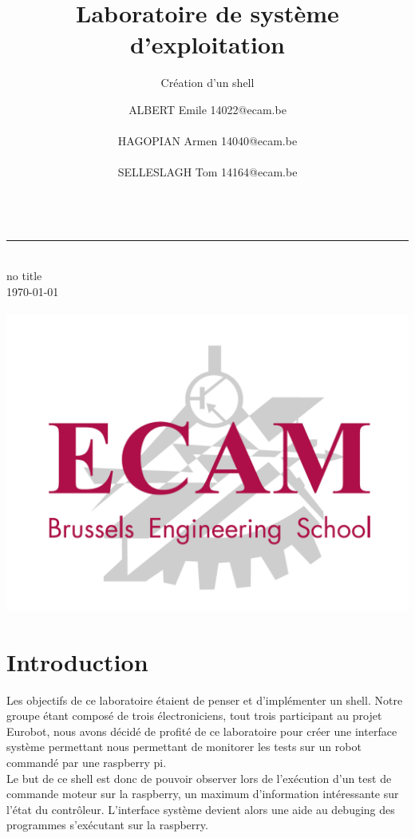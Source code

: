 \documentclass[10pt,a4paper]{article}
\title{Laboratoire de système d'exploitation}
\subtitle{Création d'un shell}
\author{
ALBERT Emile 14022@ecam.be\\\\
HAGOPIAN Armen 14040@ecam.be\\\\
SELLESLAGH Tom 14164@ecam.be\\\\
}
\makeatletter
\def\@subtitle{no title}
\makeatother
\begin{document}
\begin{titlepage} 
	\hspace{0.5cm}	
	\rule{1.5pt}{\textheight} 
	\hspace{1.5cm}		
	\parbox[b]{13cm}
	{  		
		{\huge \thetitle}\\[1\baselineskip]
		{\LARGE \@subtitle} \\[1\baselineskip]
		\today \\[3\baselineskip]
		
		{\Large \theauthor}\\[22\baselineskip]
		\hspace*{6cm}\includegraphics[scale=0.3]{logo_ECAM.png}
	}
\end{titlepage}

\section{Introduction}
Les objectifs de ce laboratoire étaient de penser et d'implémenter un shell. Notre groupe étant composé de trois électroniciens, tout trois participant au projet Eurobot, nous avons décidé de profité de ce laboratoire pour créer une interface système permettant nous permettant de monitorer les tests sur un robot commandé par une raspberry pi.\\
  
Le but de ce shell est donc de pouvoir observer lors de l'exécution d'un test de commande moteur sur la raspberry, un maximum d'information intéressante sur l'état du contrôleur. L'interface système devient alors une aide au debuging des programmes s'exécutant sur la raspberry.
\end{document}
